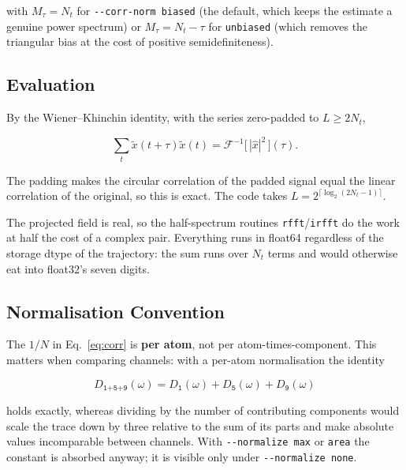 \documentclass[12pt, a4paper, oneside]{article}
\newcommand{\Nt}{N_t}
\newcommand{\Na}{N}
\begin{document}
with $M_\tau = \Nt$ for \texttt{-\/-corr-norm biased} (the default, which keeps
the estimate a genuine power spectrum) or $M_\tau = \Nt-\tau$ for
\texttt{unbiased} (which removes the triangular bias at the cost of positive
semidefiniteness).

\subsection{Evaluation}

By the Wiener--Khinchin identity, with the series zero-padded to
$L \ge 2\Nt$,

\begin{equation}
\boxed{
    \sum_t \tilde x(t{+}\tau)\tilde x(t)
    = \mathcal{F}^{-1}\bigl[\,|\hat x|^2\,\bigr](\tau).
}
\end{equation}

The padding makes the circular correlation of the padded signal equal the
linear correlation of the original, so this is exact. The code takes
$L = 2^{\lceil \log_2(2\Nt-1)\rceil}$.

The projected field is real, so the half-spectrum routines
\texttt{rfft}/\texttt{irfft} do the work at half the cost of a complex pair.
Everything runs in float64 regardless of the storage dtype of the trajectory:
the sum runs over $\Nt$ terms and would otherwise eat into float32's seven
digits.

\subsection{Normalisation Convention}

The $1/\Na$ in Eq.~\eqref{eq:corr} is \textbf{per atom}, not per
atom-times-component. This matters when comparing channels: with a per-atom
normalisation the identity

\begin{equation}
    D_{\texttt{1+5+9}}(\omega)
    = D_{\texttt{1}}(\omega) + D_{\texttt{5}}(\omega) + D_{\texttt{9}}(\omega)
\end{equation}

holds exactly, whereas dividing by the number of contributing components would
scale the trace down by three relative to the sum of its parts and make
absolute values incomparable between channels. With
\texttt{-\/-normalize max} or \texttt{area} the constant is absorbed anyway;
it is visible only under \texttt{-\/-normalize none}.

\end{document}
